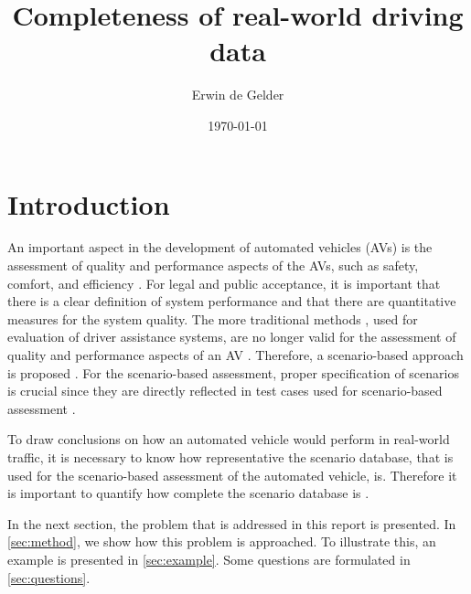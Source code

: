 \documentclass[10pt,final,a4paper,oneside,onecolumn]{article}
\def\reptitle{Completeness of real-world driving data}
\def\repauthor{Erwin de Gelder}
\theoremstyle{plain}\newtheorem{definition}{Definition}[section]    %
\theoremstyle{definition}\newtheorem{example}{Example}[section]     %
\theoremstyle{remark}\newtheorem{remarkenv}{Remark}[section]        %
\begin{document}

\title{\textbf{\reptitle}}
\author{\repauthor}
\date{\today}
\maketitle

\tableofcontents

\newpage

\section{Introduction}
\label{sec:introduction}

An important aspect in the development of automated vehicles (AVs) is the assessment of quality and performance aspects of the AVs, such as safety, comfort, and efficiency \cite{bengler2014threedecades, stellet2015taxonomy, wachenfeld2016release, putz2017pegasus, roesener2016scenariobased, kompass2015sicherheitsveranderung}. 
For legal and public acceptance, it is important that there is a clear definition of system performance and that there are quantitative measures for the system quality. 
The more traditional methods \cite{response2006code, ISO26262}, used for evaluation of driver assistance systems, are no longer valid for the assessment of quality and performance aspects of an AV \cite{wachenfeld2016release}. 
Therefore, a scenario-based approach is proposed \cite{roesener2016scenariobased, putz2017pegasus, kompass2015sicherheitsveranderung}. 
For the scenario-based assessment, proper specification of scenarios is crucial since they are directly reflected in test cases used for scenario-based assessment \cite{stellet2015taxonomy}.

To draw conclusions on how an automated vehicle would perform in real-world traffic, it is necessary to know how representative the scenario database, that is used for the scenario-based assessment of the automated vehicle, is. Therefore it is important to quantify how complete the scenario database is \cite{geyer2014, alvarez2017prospective, stellet2015taxonomy}.

In the next section, the problem that is addressed in this report is presented. In \cref{sec:method}, we show how this problem is approached. To illustrate this, an example is presented in \cref{sec:example}. Some questions are formulated in \cref{sec:questions}.
\end{document}
